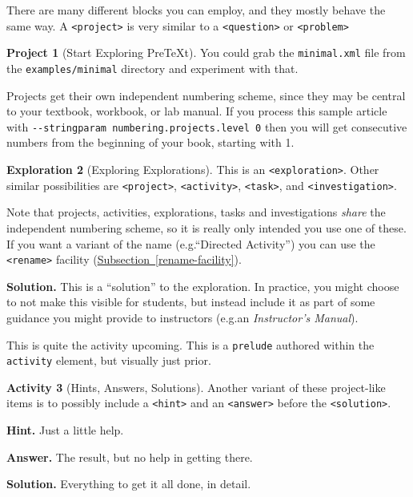 \documentclass[10pt,]{article}
\theoremstyle{plain}
\theoremstyle{definition}
\theoremstyle{definition}
\theoremstyle{definition}
\theoremstyle{definition}
\newtheorem{project}{Project}[section]
\theoremstyle{definition}
\newtheorem{activity}[project]{Activity}
\newtheorem{exploration}[project]{Exploration}
\theoremstyle{definition}
\numberwithin{equation}{section}
\begin{document}
\hypertarget{p-62}{}%
There are many different blocks you can employ, and they mostly behave the same way.  A \lstinline?<project>? is very similar to a \lstinline?<question>? or \lstinline?<problem>?%
\begin{project}[Start Exploring PreTeXt]\label{project-1}
\hypertarget{p-63}{}%
You could grab the \lstinline?minimal.xml? file from the \lstinline?examples/minimal? directory and experiment with that.%
\par
\hypertarget{p-64}{}%
Projects get their own independent numbering scheme, since they may be central to your textbook, workbook, or lab manual.  If you process this sample article with \lstinline?--stringparam numbering.projects.level 0? then you will get consecutive numbers from the beginning of your book, starting with 1.%
\end{project}
\begin{exploration}[Exploring Explorations]\label{exploration-1}
\hypertarget{p-65}{}%
This is an \lstinline?<exploration>?.  Other similar possibilities are \lstinline?<project>?, \lstinline?<activity>?, \lstinline?<task>?, and \lstinline?<investigation>?.%
\par
\hypertarget{p-66}{}%
Note that projects, activities, explorations, tasks and investigations \emph{share} the independent numbering scheme, so it is really only intended you use one of these.  If you want a variant of the name (e.g.\@ ``Directed Activity'') you can use the \lstinline?<rename>? facility (\hyperref[rename-facility]{Subsection~\ref{rename-facility}}).%
\par\smallskip%
\noindent\textbf{Solution.}\hypertarget{solution-5}{}\quad%
\hypertarget{p-67}{}%
This is a ``solution'' to the exploration.  In practice, you might choose to not make this visible for students, but instead include it as part of some guidance you might provide to instructors (e.g.\@ an \textsl{Instructor's Manual}).%
\end{exploration}
\par
\hypertarget{p-68}{}%
This is quite the activity upcoming.  This is a \lstinline?prelude? authored within the \lstinline?activity? element, but visually just prior.%
\begin{activity}[Hints, Answers, Solutions]\label{activity-with-hint-answer-solution}
\hypertarget{p-69}{}%
Another variant of these project-like items is to possibly include a \lstinline?<hint>? and an \lstinline?<answer>? before the \lstinline?<solution>?.%
\par\smallskip%
\noindent\textbf{Hint.}\hypertarget{hint-3}{}\quad%
\hypertarget{p-70}{}%
Just a little help.%
\par\smallskip%
\noindent\textbf{Answer.}\hypertarget{answer-2}{}\quad%
\hypertarget{p-71}{}%
The result, but no help in getting there.%
\par\smallskip%
\noindent\textbf{Solution.}\hypertarget{solution-6}{}\quad%
\hypertarget{p-72}{}%
Everything to get it all done, in detail.%
\end{activity}
\end{document}
